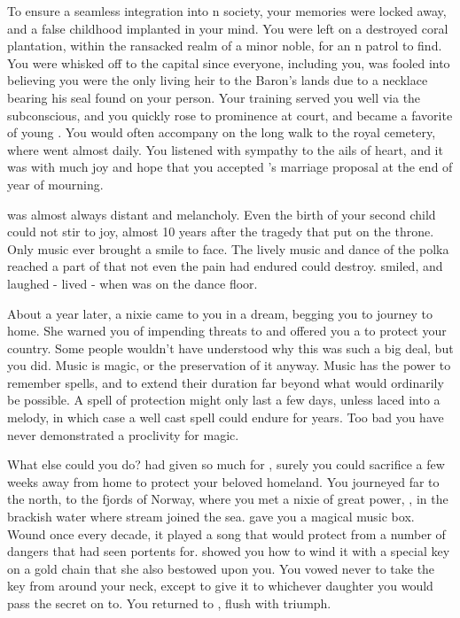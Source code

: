 \documentclass[char]{NeptuneBall}
\begin{document}
To ensure a seamless integration into \pAtlantis{}n society, your memories were locked away, and a false childhood implanted in your mind. You were left on a destroyed coral plantation, within the ransacked realm of a minor noble, for an \pAtlantis{}n patrol to find. You were whisked off to the capital since everyone, including you, was fooled into believing you were the only living heir to the Baron's lands due to a necklace bearing his seal found on your person. Your training served you well via the subconscious, and you quickly rose to prominence at court, and became a favorite of young \cKing{\King} \cKing{}. You would often accompany \cKing{\them} on the long walk to the royal cemetery, where \cKing{\they} went almost daily. You listened with sympathy to the ails of \cKing{\their} heart, and it was with much joy and hope that you accepted \cKing{\King} \cKing{}'s marriage proposal at the end of \cKing{\their} year of mourning.

\cKing{\King} \cKing{} was almost always distant and melancholy. Even the birth of your second child could not stir \cKing{\them} to joy, almost 10 years after the tragedy that put \cKing{\them} on the throne. Only music ever brought a smile to \cKing{\their} face. The lively music and dance of the polka reached a part of \cKing{\them} that not even the pain \cKing{\they} had endured could destroy. \cKing{\They} smiled, and laughed - \cKing{\They} lived - when \cKing{\they} was on the dance floor.

About a year later, a nixie came to you in a dream, begging you to journey to \cNixie{\them} home. She warned you of impending threats to \pAtlantis{} and offered you a \iMusicBox{\MYname} to protect your country. Some people wouldn't have understood why this was such a big deal, but you did. Music is magic, or the preservation of it anyway. Music has the power to remember spells, and to extend their duration far beyond what would ordinarily be possible. A spell of protection might only last a few days, unless laced into a melody, in which case a well cast spell could endure for years. Too bad you have never demonstrated a proclivity for magic.

What else could you do? \cKing{} had given so much for \pAtlantis{}, surely you could sacrifice a few weeks away from home to protect your beloved homeland. You journeyed far to the north, to the fjords of Norway, where you met a nixie of great power, \cNixie{\MYname}, in the brackish water where \cNixie{\them} stream joined the sea. \cNixie{} gave you a magical music box. Wound once every decade, it played a song that would protect \pAtlantis{} from a number of dangers that \cNixie{} had seen portents for. \cNixie{\They} showed you how to wind it with a special key on a gold chain that she also bestowed upon you. You vowed never to take the key from around your neck, except to give it to whichever daughter you would pass the secret on to. You returned to \pAtlantis{}, flush with triumph.
\end{document}
